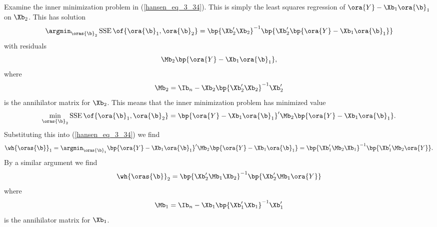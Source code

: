 Examine the inner minimization problem in (\ref{hansen_eq_3_34}). This is simply the least squares regression of $\ora{Y} - \Xb_1 \ora{\b}_1$ on $\Xb_2$. This has solution
\begin{equation}
    \notag
    \argmin_{\oras{\b}_2} \operatorname*{SSE}\of{\ora{\b}_1, \ora{\b}_2} = \bp{\Xb_2^\prime \Xb_2}^{-1} \bp{\Xb_2^\prime \bp{\ora{Y} - \Xb_1 \ora{\b}_1}}
\end{equation}
with residuals
\begin{equation}
    \notag
    \Mb_2 \bp{\ora{Y} - \Xb_1 \ora{\b}_1},
\end{equation}
where
\begin{equation}
    \label{hansen_eq_3_35}
    \Mb_2 = \Ib_n - \Xb_2 \bp{\Xb_2^\prime \Xb_2}^{-1} \Xb_2^\prime
\end{equation}
is the annihilator matrix for $\Xb_2$. This means that the inner minimization problem has minimized value 
\begin{equation}
    \notag 
    \min_{\oras{\b}_2}\operatorname*{SSE}\of{\ora{\b}_1, \ora{\b}_2} = \bp{\ora{Y} - \Xb_1 \ora{\b}_1}^\prime \Mb_2 \bp{\ora{Y} - \Xb_1 \ora{\b}_1}.
\end{equation}
Substituting this into (\ref{hansen_eq_3_34}) we find
\begin{equation}
    \notag
    \wh{\oras{\b}}_1 = \argmin_{\oras{\b}_1} \bp{\ora{Y} - \Xb_1 \ora{\b}_1}^\prime \Mb_2 \bp{\ora{Y} - \Xb_1 \ora{\b}_1} = \bp{\Xb_1^\prime \Mb_2 \Xb_1}^{-1}  \bp{\Xb_1^\prime \Mb_2 \ora{Y}}.
\end{equation}
By a similar argument we find
\begin{equation}
    \notag
    \wh{\oras{\b}}_2 = \bp{\Xb_2^\prime \Mb_1 \Xb_2}^{-1}  \bp{\Xb_2^\prime \Mb_1 \ora{Y}}
\end{equation}
where 
\begin{equation}
    \label{hansen_eq_3_36}
    \Mb_1 = \Ib_n - \Xb_1 \bp{\Xb_1^\prime \Xb_1}^{-1} \Xb_1^\prime
\end{equation}
is the annihilator matrix for $\Xb_1$.

